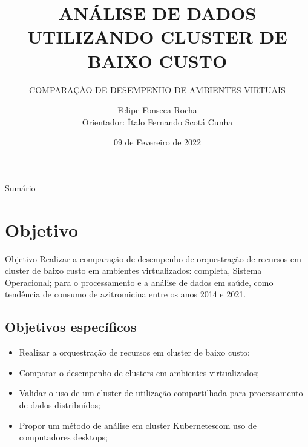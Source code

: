 \documentclass[10pt,brazil]{beamer}
\theoremstyle{definition}
\begin{document}

\title[]{ANÁLISE DE DADOS UTILIZANDO CLUSTER DE BAIXO CUSTO}
\subtitle{COMPARAÇÃO DE DESEMPENHO DE AMBIENTES VIRTUAIS}


\author[Felipe Rocha]{Felipe Fonseca Rocha \\
  \vspace{0.25cm}
  Orientador: Ítalo Fernando Scotá Cunha }
\date{09 de Fevereiro de 2022}

\AtBeginSection{%
  \begin{frame}
    \tableofcontents[currentsection, subsectionstyle=show/show/hide]
  \end{frame}
}
\frame{\maketitle}


\begin{frame}{Sumário}
  \tableofcontents
\end{frame}


%
%

\section{Objetivo}

\begin{frame}{Objetivo}
  Realizar a comparação de desempenho de orquestração de recursos em cluster de baixo custo em ambientes virtualizados:
  completa,
  Sistema Operacional; para o processamento e a análise de dados em saúde, como tendência de consumo de azitromicina entre os anos 2014 e 2021.
\end{frame}

\subsection{Objetivos específicos}

\begin{frame}
  \begin{itemize}
    \item Realizar a orquestração de recursos em cluster de baixo custo;
    \item Comparar o desempenho de clusters em ambientes virtualizados;
    \item Validar o uso de um cluster de utilização compartilhada para processamento de dados distribuídos;
    \item Propor um método de análise em cluster Kubernetes\textregistered com uso de computadores desktops;
  \end{itemize}
\end{frame}
\end{document}
